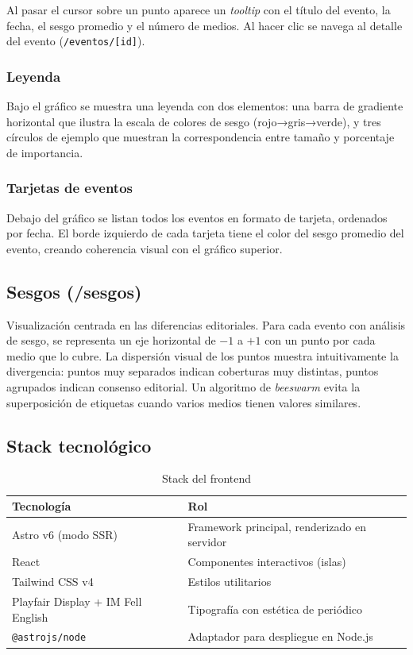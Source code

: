 \documentclass[12pt,a4paper]{article}
\begin{document}
Al pasar el cursor sobre un punto aparece un \textit{tooltip} con el título del evento, la fecha, el sesgo promedio y el número de medios. Al hacer clic se navega al detalle del evento (\texttt{/eventos/[id]}).

\subsubsection*{Leyenda}

Bajo el gráfico se muestra una leyenda con dos elementos: una barra de gradiente horizontal que ilustra la escala de colores de sesgo (rojo→gris→verde), y tres círculos de ejemplo que muestran la correspondencia entre tamaño y porcentaje de importancia.

\subsubsection*{Tarjetas de eventos}

Debajo del gráfico se listan todos los eventos en formato de tarjeta, ordenados por fecha. El borde izquierdo de cada tarjeta tiene el color del sesgo promedio del evento, creando coherencia visual con el gráfico superior.

\subsection{Sesgos (/sesgos)}

Visualización centrada en las diferencias editoriales. Para cada evento con análisis de sesgo, se representa un eje horizontal de $-1$ a $+1$ con un punto por cada medio que lo cubre. La dispersión visual de los puntos muestra intuitivamente la divergencia: puntos muy separados indican coberturas muy distintas, puntos agrupados indican consenso editorial. Un algoritmo de \textit{beeswarm} evita la superposición de etiquetas cuando varios medios tienen valores similares.

\subsection{Stack tecnológico}

\begin{table}[h]
\centering
\caption{Stack del frontend}
\begin{tabular}{@{}ll@{}}
\toprule
\rowcolor{azulAS!15}
\textbf{Tecnología} & \textbf{Rol} \\
\midrule
Astro v6 (modo SSR) & Framework principal, renderizado en servidor \\
\rowcolor{grisCelda}
React & Componentes interactivos (islas) \\
Tailwind CSS v4 & Estilos utilitarios \\
\rowcolor{grisCelda}
Playfair Display + IM Fell English & Tipografía con estética de periódico \\
\texttt{@astrojs/node} & Adaptador para despliegue en Node.js \\
\bottomrule
\end{tabular}
\end{table}
\end{document}
